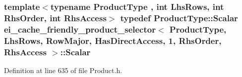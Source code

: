 \hypertarget{structei__cache__friendly__product__selector_3_01_product_type_00_01_lhs_rows_00_01_row_major_0004e85d331a9d3202615416911b3c7cf8_a7aabd52ad58b190245811558433cda0e}{
\subsubsection[{Scalar}]{\setlength{\rightskip}{0pt plus 5cm}template$<$typename Product\-Type , int Lhs\-Rows, int Rhs\-Order, int Rhs\-Access$>$ typedef Product\-Type\-::\-Scalar {\bf ei\-\_\-cache\-\_\-friendly\-\_\-product\-\_\-selector}$<$ Product\-Type, Lhs\-Rows, {\bf Row\-Major}, {\bf Has\-Direct\-Access}, 1, Rhs\-Order, Rhs\-Access $>$\-::{\bf Scalar}}}\label{structei__cache__friendly__product__selector_3_01_product_type_00_01_lhs_rows_00_01_row_major_0004e85d331a9d3202615416911b3c7cf8_a7aabd52ad58b190245811558433cda0e}


Definition at line 635 of file Product.\-h.



